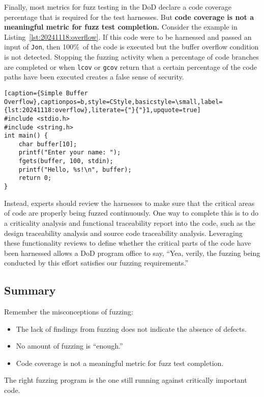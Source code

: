 Finally, most metrics for fuzz testing in the DoD declare a code coverage percentage that is required for the test harnesses. But \textbf{code coverage is not a meaningful metric for fuzz test completion.} Consider the example in Listing~\ref{lst:20241118:overflow}. If this code were to be harnessed and passed an input of \texttt{Jon}, then 100\%\ of the code is executed but the buffer overflow condition is not detected. Stopping the fuzzing activity when a percentage of code branches are completed or when \texttt{lcov} or \texttt{gcov} return that a certain percentage of the code paths have been executed creates a false sense of security.

\begin{lstlisting}[caption={Simple Buffer Overflow},captionpos=b,style=CStyle,basicstyle=\small,label={lst:20241118:overflow},literate={"}{"}1,upquote=true]
#include <stdio.h>
#include <string.h>
int main() {
    char buffer[10];
    printf("Enter your name: ");
    fgets(buffer, 100, stdin);
    printf("Hello, %s!\n", buffer);
    return 0;
}
\end{lstlisting}

Instead, experts should review the harnesses to make sure that the critical areas of code are properly being fuzzed continuously. One way to complete this is to do a criticality analysis and functional traceability report into the code, such as the design traceability analysis\autocite[\pno~114]{20241118:ieee1012} and source code traceability analysis\autocite[\pno~119]{20241118:ieee1012}. Leveraging these functionality reviews to define whether the critical parts of the code have been harnessed allows a DoD program office to say, ``Yea, verily, the fuzzing being conducted by this effort satisfies our fuzzing requirements.''

\subsection*{Summary}
Remember the misconceptions of fuzzing:
\begin{itemize}
    \item The lack of findings from fuzzing does not indicate the absence of defects.
    \item No amount of fuzzing is ``enough.''
    \item Code coverage is not a meaningful metric for fuzz test completion.
\end{itemize}

The right fuzzing program is the one still running against critically important code.
